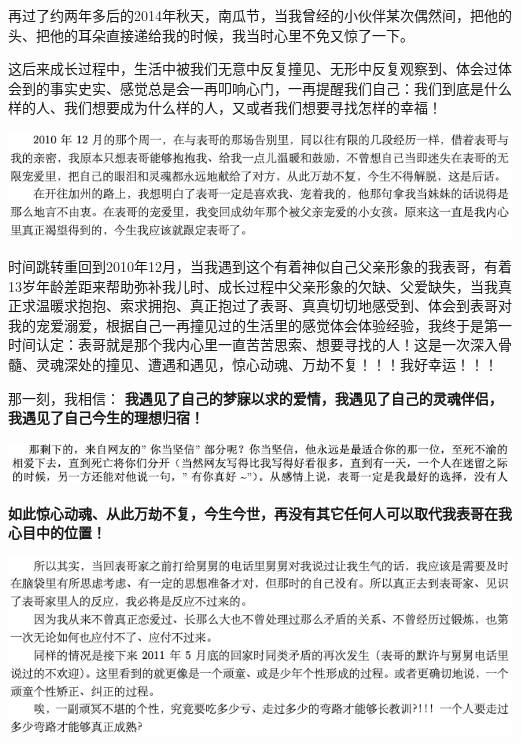 \documentclass[9pt, b5paper]{article}
\begin{document}
再过了约两年多后的2014年秋天，南瓜节，当我曾经的小伙伴某次偶然间，把他的头、把他的耳朵直接递给我的时候，我当时心里不免又惊了一下。

这后来成长过程中，生活中被我们无意中反复撞见、无形中反复观察到、体会过体会到的事实史实、感觉总是会一再叩响心门，一再提醒我们自己：我们到底是什么样的人、我们想要成为什么样的人，又或者我们想要寻找怎样的幸福！

\begin{center}
\includegraphics[width=.9\linewidth]{./pic/backups_plans_20210423_111600.png}
\end{center}

时间跳转重回到2010年12月，当我遇到这个有着神似自己父亲形象的我表哥，有着13岁年龄差距来帮助弥补我儿时、成长过程中父亲形象的欠缺、父爱缺失，当我真正求温暖求抱抱、索求拥抱、真正抱过了表哥、真真切切地感受到、体会到表哥对我的宠爱溺爱，根据自己一再撞见过的生活里的感觉体会体验经验，我终于是第一时间认定：表哥就是那个我内心里一直苦苦思索、想要寻找的人！这是一次深入骨髓、灵魂深处的撞见、遭遇和遇见，惊心动魂、万劫不复！！！我好幸运！！！

那一刻，我相信： \textbf{我遇见了自己的梦寐以求的爱情，我遇见了自己的灵魂伴侣，我遇见了自己今生的理想归宿！}

\begin{center}
\includegraphics[width=.9\linewidth]{./pic/backups_plans_20210423_112236.png}
\end{center}

\textbf{如此惊心动魂、从此万劫不复，今生今世，再没有其它任何人可以取代我表哥在我心目中的位置！}

\begin{center}
\includegraphics[width=.9\linewidth]{./pic/backups_plans_20210423_102533.png}
\end{center}
\end{document}
